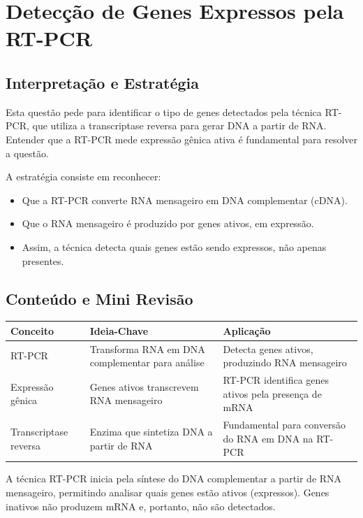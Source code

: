\documentclass{article}
\begin{document}
\section*{Detecção de Genes Expressos pela RT-PCR}

\subsection*{Interpretação e Estratégia}
Esta questão pede para identificar o tipo de genes detectados pela técnica RT-PCR, que utiliza a transcriptase reversa para gerar DNA a partir de RNA. Entender que a RT-PCR mede expressão gênica ativa é fundamental para resolver a questão.

A estratégia consiste em reconhecer:
\begin{itemize}
  \item Que a RT-PCR converte RNA mensageiro em DNA complementar (cDNA).
  \item Que o RNA mensageiro é produzido por genes ativos, em expressão.
  \item Assim, a técnica detecta quais genes estão sendo expressos, não apenas presentes.
\end{itemize}

\subsection*{Conteúdo e Mini Revisão}

\begin{tabular}{|p{4cm}|p{6cm}|p{6cm}|}
\hline
\textbf{Conceito} & \textbf{Ideia-Chave} & \textbf{Aplicação} \\
\hline
RT-PCR & Transforma RNA em DNA complementar para análise & Detecta genes ativos, produzindo RNA mensageiro \\
\hline
Expressão gênica & Genes ativos transcrevem RNA mensageiro & RT-PCR identifica genes ativos pela presença de mRNA \\
\hline
Transcriptase reversa & Enzima que sintetiza DNA a partir de RNA & Fundamental para conversão do RNA em DNA na RT-PCR \\
\hline
\end{tabular}

\bigskip

A técnica RT-PCR inicia pela síntese do DNA complementar a partir de RNA mensageiro, permitindo analisar quais genes estão ativos (expressos). Genes inativos não produzem mRNA e, portanto, não são detectados.
\end{document}
